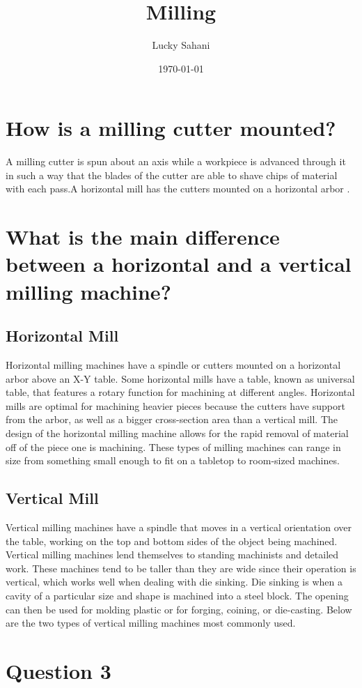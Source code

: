 \documentclass[a4paper]{article}
\title{Milling}
\author{Lucky Sahani}
\date{\today}
\begin{document}
\maketitle



\section{How is a milling cutter mounted?}
 A milling cutter is spun about an axis while a workpiece is advanced through it in such a way that the blades of the cutter are able to shave chips of material with each pass.A horizontal mill has  the cutters  mounted on a horizontal arbor .

\section{What is the main difference between a horizontal and a vertical milling machine?}

\subsection{Horizontal Mill}
Horizontal milling machines have a spindle or cutters mounted on a horizontal arbor above an X-Y table. Some horizontal mills have a table, known as universal table, that features a rotary function for machining at different angles. Horizontal mills are optimal for machining heavier pieces because the cutters have support from the arbor, as well as a bigger cross-section area than a vertical mill. The design of the horizontal milling machine allows for the rapid removal of material off of the piece one is machining. These types of milling machines can range in size from something small enough to fit on a tabletop to room-sized machines.

\subsection{Vertical Mill}
Vertical milling machines have a spindle that moves in a vertical orientation over the table, working on the top and bottom sides of the object being machined. Vertical milling machines lend themselves to standing machinists and detailed work. These machines tend to be taller than they are wide since their operation is vertical, which works well when dealing with die sinking. Die sinking is when a cavity of a particular size and shape is machined into a steel block. The opening can then be used for molding plastic or for forging, coining, or die-casting. Below are the two types of vertical milling machines most commonly used.

\section{Question 3}
\end{document}
